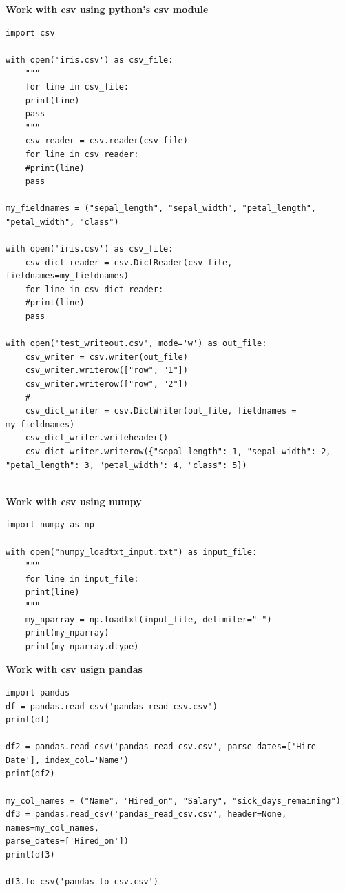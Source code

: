 \documentclass[11pt]{article}
\begin{document}
\textbf{Work with csv using python's csv module}
\begin{verbatim}
import csv

with open('iris.csv') as csv_file:
    """
    for line in csv_file:
	print(line)
	pass
    """
    csv_reader = csv.reader(csv_file)
    for line in csv_reader:
	#print(line)
	pass

my_fieldnames = ("sepal_length", "sepal_width", "petal_length", "petal_width", "class")

with open('iris.csv') as csv_file:
    csv_dict_reader = csv.DictReader(csv_file, fieldnames=my_fieldnames)
    for line in csv_dict_reader:
	#print(line)
	pass

with open('test_writeout.csv', mode='w') as out_file:
    csv_writer = csv.writer(out_file)
    csv_writer.writerow(["row", "1"])
    csv_writer.writerow(["row", "2"])
    #
    csv_dict_writer = csv.DictWriter(out_file, fieldnames = my_fieldnames)
    csv_dict_writer.writeheader()
    csv_dict_writer.writerow({"sepal_length": 1, "sepal_width": 2, "petal_length": 3, "petal_width": 4, "class": 5})


\end{verbatim}

\textbf{Work with csv using numpy}
\begin{verbatim}
import numpy as np

with open("numpy_loadtxt_input.txt") as input_file:
    """
    for line in input_file:
	print(line)
    """
    my_nparray = np.loadtxt(input_file, delimiter=" ")
    print(my_nparray)
    print(my_nparray.dtype)
\end{verbatim}

\textbf{Work with csv usign pandas}
\begin{verbatim}
import pandas
df = pandas.read_csv('pandas_read_csv.csv')
print(df)

df2 = pandas.read_csv('pandas_read_csv.csv', parse_dates=['Hire Date'], index_col='Name')
print(df2)

my_col_names = ("Name", "Hired_on", "Salary", "sick_days_remaining")
df3 = pandas.read_csv('pandas_read_csv.csv', header=None, names=my_col_names,
parse_dates=['Hired_on'])
print(df3)

df3.to_csv('pandas_to_csv.csv')
\end{verbatim}
\end{document}
